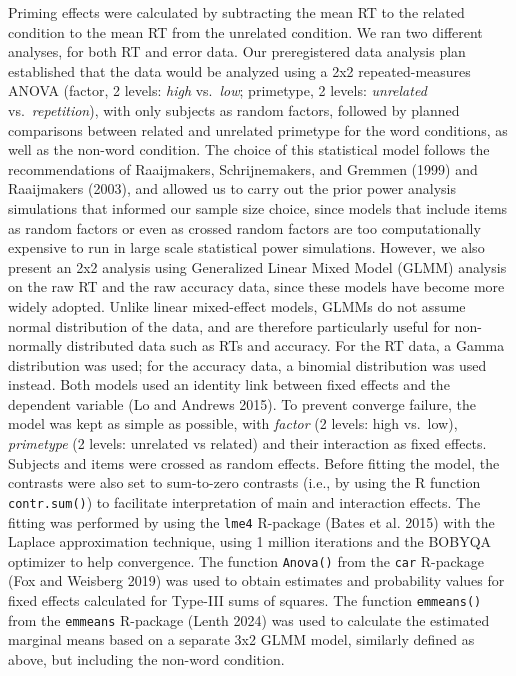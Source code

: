 \documentclass[
]{interact}
\begin{document}
Priming effects were calculated by subtracting the mean RT to the
related condition to the mean RT from the unrelated condition. We ran
two different analyses, for both RT and error data. Our preregistered
data analysis plan established that the data would be analyzed using a
2x2 repeated-measures ANOVA (factor, 2 levels: \emph{high}
vs.~\emph{low}; primetype, 2 levels: \emph{unrelated}
vs.~\emph{repetition}), with only subjects as random factors, followed
by planned comparisons between related and unrelated primetype for the
word conditions, as well as the non-word condition. The choice of this
statistical model follows the recommendations of Raaijmakers,
Schrijnemakers, and Gremmen (1999) and Raaijmakers (2003), and allowed
us to carry out the prior power analysis simulations that informed our
sample size choice, since models that include items as random factors or
even as crossed random factors are too computationally expensive to run
in large scale statistical power simulations. However, we also present
an 2x2 analysis using Generalized Linear Mixed Model (GLMM) analysis on
the raw RT and the raw accuracy data, since these models have become
more widely adopted. Unlike linear mixed-effect models, GLMMs do not
assume normal distribution of the data, and are therefore particularly
useful for non-normally distributed data such as RTs and accuracy. For
the RT data, a Gamma distribution was used; for the accuracy data, a
binomial distribution was used instead. Both models used an identity
link between fixed effects and the dependent variable (Lo and Andrews
2015). To prevent converge failure, the model was kept as simple as
possible, with \emph{factor} (2 levels: high vs.~low), \emph{primetype}
(2 levels: unrelated vs related) and their interaction as fixed effects.
Subjects and items were crossed as random effects. Before fitting the
model, the contrasts were also set to sum-to-zero contrasts (i.e., by
using the R function \texttt{contr.sum()}) to facilitate interpretation
of main and interaction effects. The fitting was performed by using the
\texttt{lme4} R-package (Bates et al. 2015) with the Laplace
approximation technique, using 1 million iterations and the BOBYQA
optimizer to help convergence. The function \texttt{Anova()} from the
\texttt{car} R-package (Fox and Weisberg 2019) was used to obtain
estimates and probability values for fixed effects calculated for
Type-III sums of squares. The function \texttt{emmeans()} from the
\texttt{emmeans} R-package (Lenth 2024) was used to calculate the
estimated marginal means based on a separate 3x2 GLMM model, similarly
defined as above, but including the non-word condition.
\end{document}
